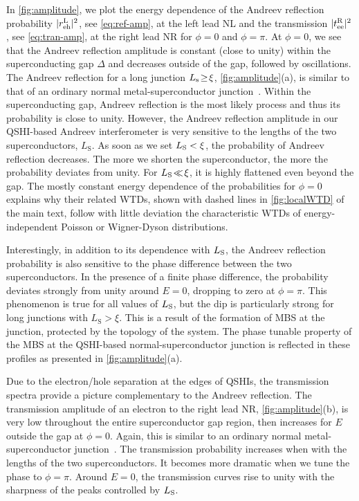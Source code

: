 \documentclass[aps,prl,amsmath,twocolumn,floatfix,superscriptaddress,longbibliography,footinbib]{revtex4-1}
\begin{document}
In \cref{fig:amplitude}, we plot the energy dependence of the Andreev reflection probability $|r^{\rm L}_{\rm eh}|^2$, see \cref{eq:ref-amp}, at the left lead NL and the transmission $|t^{\rm R}_{\rm ee}|^2$, see \cref{eq:tran-amp}, at the right lead NR for $\phi\!=\!0$ and $\phi\!=\!\pi$. 
At $\phi\!=\!0$, we see that the Andreev reflection amplitude is constant (close to unity) within the superconducting gap $\Delta$ and decreases outside of the gap, followed by oscillations. The Andreev reflection for a long junction $L_{\rm s}\!\ge\!\xi$, \cref{fig:amplitude}(a), is similar to that of an ordinary normal metal-superconductor junction~\cite{Blonder1982}. Within the superconducting gap, Andreev reflection is the most likely process and thus its probability is close to unity. However, the Andreev reflection amplitude in our QSHI-based Andreev interferometer is very sensitive to the lengths of the two superconductors, $L_\text{S}$. As soon as we set $L_{\rm S}<\xi$, the probability of Andreev reflection decreases. The more we shorten the superconductor, the more the probability deviates from unity. For $L_{\rm S}\!\ll\!\xi$, it is highly flattened even beyond the gap. The mostly constant energy dependence of the probabilities for $\phi=0$ explains why their related WTDs, shown with dashed lines in \cref{fig:localWTD} of the main text, follow with little deviation the characteristic WTDs of energy-independent Poisson or Wigner-Dyson distributions. 

Interestingly, in addition to its dependence with $L_{\rm S}$, the Andreev reflection probability is also sensitive to the phase difference between the two superconductors. In the presence of a finite phase difference, the probability deviates strongly from unity around $E\!=\!0$, dropping to zero at $\phi\!=\!\pi$. This phenomenon is true for all values of $L_{\rm S}$, but the dip is particularly strong for long junctions with $L_\text{S}>\xi$. This is a result of the formation of MBS at the junction, protected by the topology of the system. The phase tunable property of the MBS at the QSHI-based normal-superconductor junction is reflected in these profiles as presented in \cref{fig:amplitude}(a). 

Due to the electron/hole separation at the edges of QSHIs, the transmission spectra provide a picture complementary to the Andreev reflection. The transmission amplitude of an electron to the right lead NR, \cref{fig:amplitude}(b), is very low throughout the entire superconductor gap region, then increases for $E$ outside the gap at $\phi\!=\!0$. Again, this is similar to an ordinary normal metal-superconductor junction~\cite{Blonder1982}. The transmission probability increases when with the lengths of the two superconductors. It becomes more dramatic when we tune the phase to $\phi=\pi$. Around $E\!=\!0$, the transmission curves rise to unity with the sharpness of the peaks controlled by $L_{\rm S}$. 
\end{document}
